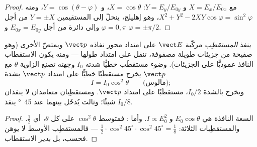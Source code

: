 \begin{proof}
مع $X = E_x/E_{0x}$ و $Y = E_y/E_{0y}$: $X = \cos\theta$، و $Y = \cos(\theta - \varphi)$، ومنه
$X^2 + Y^2 - 2XY\cos\varphi = \sin^2\varphi$، وهو إهليلج، ينحلّ إلى
المستقيمين $Y = \pm X$ من أجل $\varphi = 0, \pi$ وإلى دائرة من أجل $E_{0x} = E_{0y}$
و $\varphi = \pm\pi/2$.
\end{proof}

\begin{proposition}\label{prop:b2:plane-waves-polarization:malus}
ينفذ \emph{المستقطِب} مركّبة $\vect E$ على امتداد محور
نفاذه $\vect p$ ويمتصّ الأخرى (وهو صفيحة من جزيئات طويلة
مصفوفة، تنقل على امتداد طولها --- ومنه يكون الاستقطاب
النافذ عموديًّا على الجزيئات). وضوء مستقطَب خطيًّا
شدته $I_0$ وجهته تصنع الزاوية $\theta$ مع
$\vect p$ يخرج مستقطَبًا خطيًّا على امتداد $\vect p$ بشدة
\[
I = I_0\cos^2\theta \qquad\text{(مالوس)} ;
\]
ويخرج  بالشدة $I_0/2$، مستقطَبًا على امتداد $\vect p$. ومستقطِبان
متعامدان لا ينفذان شيئًا؛ وثالث يُدخَل بينهما عند
\qty{45}{\degree} ينفذ $I_0/8$.
\end{proposition}

\begin{proof}
السعة النافذة هي $E_0\cos\theta$ و $I \propto E_0^2$. وأما : فمتوسط $\cos^2\theta$ على كل $\theta$، أي $\tfrac12$. والمستقطِبات الثلاثة:
$\tfrac12\cdot\cos^2 45^\circ\cdot\cos^2 45^\circ = \tfrac18$ --- فالمستقطِب
الأوسط لا يوهن فحسب، بل \emph{يدير} الاستقطاب.
\end{proof}

